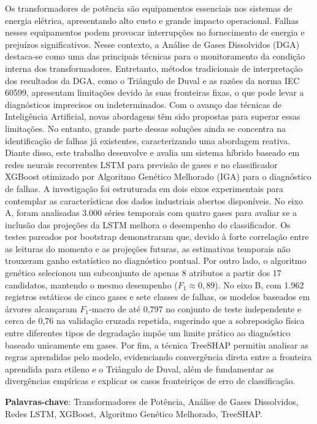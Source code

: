 \setlength{\absparsep}{18pt} %
\begin{resumo}
Os transformadores de potência são equipamentos essenciais nos sistemas de energia elétrica, apresentando alto custo e grande impacto operacional. Falhas nesses equipamentos podem provocar interrupções no fornecimento de energia e prejuízos significativos. Nesse contexto, a Análise de Gases Dissolvidos (DGA) destaca-se como uma das principais técnicas para o monitoramento da condição interna dos transformadores. Entretanto, métodos tradicionais de interpretação dos resultados da DGA, como o Triângulo de Duval e as razões da norma IEC 60599, apresentam limitações devido às suas fronteiras fixas, o que pode levar a diagnósticos imprecisos ou indeterminados. Com o avanço das técnicas de Inteligência Artificial, novas abordagens têm sido propostas para superar essas limitações. No entanto, grande parte dessas soluções ainda se concentra na identificação de falhas já existentes, caracterizando uma abordagem reativa. Diante disso, este trabalho desenvolve e avalia um sistema híbrido baseado em redes neurais recorrentes LSTM para previsão de gases e no classificador XGBoost otimizado por Algoritmo Genético Melhorado (IGA) para o diagnóstico de falhas. A investigação foi estruturada em dois eixos experimentais para contemplar as características dos dados industriais abertos disponíveis. No eixo A, foram analisadas 3.000 séries temporais com quatro gases para avaliar se a inclusão das projeções da LSTM melhora o desempenho do classificador. Os testes pareados por bootstrap demonstraram que, devido à forte correlação entre as leituras do momento e as projeções futuras, as estimativas temporais não trouxeram ganho estatístico no diagnóstico pontual. Por outro lado, o algoritmo genético selecionou um subconjunto de apenas 8 atributos a partir dos 17 candidatos, mantendo o mesmo desempenho ($F_1 \approx 0,89$). No eixo B, com 1.962 registros estáticos de cinco gases e sete classes de falhas, os modelos baseados em árvores alcançaram $F_1$-macro de até 0,797 no conjunto de teste independente e cerca de 0,76 na validação cruzada repetida, sugerindo que a sobreposição física entre diferentes tipos de degradação impõe um limite prático ao diagnóstico baseado unicamente em gases. Por fim, a técnica TreeSHAP permitiu analisar as regras aprendidas pelo modelo, evidenciando convergência direta entre a fronteira aprendida para etileno e o Triângulo de Duval, além de fundamentar as divergências empíricas e explicar os casos fronteiriços de erro de classificação.

 \textbf{Palavras-chave}: Transformadores de Potência, Análise de Gases Dissolvidos, Redes LSTM, XGBoost, Algoritmo Genético Melhorado, TreeSHAP.
\end{resumo}

